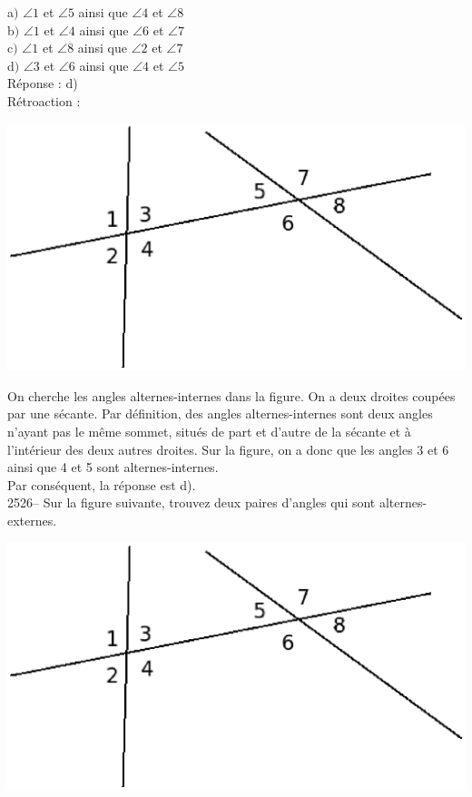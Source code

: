 \documentclass[letterpaper, 12pt]{article}
\begin{document}
a$)$ $\angle1$ et $\angle5$ ainsi que $\angle4$ et $\angle8$\\
b$)$ $\angle1$ et $\angle4$ ainsi que $\angle6$ et $\angle7$\\
c$)$ $\angle1$ et $\angle8$ ainsi que $\angle2$ et $\angle7$\\
d$)$ $\angle3$ et $\angle6$ ainsi que $\angle4$ et $\angle5$\\

R\'eponse : d)\\

R\'etroaction :\\
\begin{center}
 \includegraphics[width=8 cm,bb=0 474 591 842]{Q2524.eps}
\end{center}
On cherche les angles alternes-internes dans la figure. On a deux droites coup\'ees par une s\'ecante. Par d\'efinition, des angles alternes-internes sont deux angles n'ayant pas le m\^eme sommet, situ\'es de part et d'autre de la s\'ecante et \`a l'int\'erieur des deux autres droites. Sur la figure, on a donc que les angles 3 et 6 ainsi que 4 et 5 sont alternes-internes.\\
Par cons\'equent, la r\'eponse est d).\\

2526-- Sur la figure suivante, trouvez deux paires d'angles qui sont alternes-externes.\\
\begin{center}
 \includegraphics[width=8 cm,bb=0 474 591 842]{Q2524.eps}
\end{center}
\end{document}
